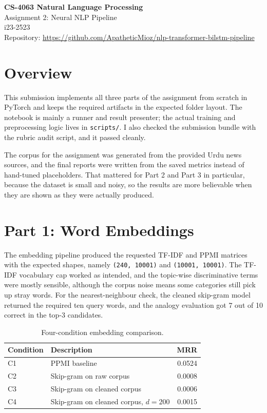 \documentclass[12pt]{article}
\begin{document}
\begin{center}
{\Large \textbf{CS-4063 Natural Language Processing}}\\[0.25em]
{\large Assignment 2: Neural NLP Pipeline}\\[0.4em]
{i23-2523}\\[0.25em]
Repository: \url{https://github.com/ApatheticMioz/nlp-transformer-bilstm-pipeline}
\end{center}

\section{Overview}
This submission implements all three parts of the assignment from scratch in PyTorch and keeps the required artifacts in the expected folder layout. The notebook is mainly a runner and result presenter; the actual training and preprocessing logic lives in \texttt{scripts/}. I also checked the submission bundle with the rubric audit script, and it passed cleanly.

The corpus for the assignment was generated from the provided Urdu news sources, and the final reports were written from the saved metrics instead of hand-tuned placeholders. That mattered for Part 2 and Part 3 in particular, because the dataset is small and noisy, so the results are more believable when they are shown as they were actually produced.

\section{Part 1: Word Embeddings}
The embedding pipeline produced the requested TF-IDF and PPMI matrices with the expected shapes, namely \texttt{(240, 10001)} and \texttt{(10001, 10001)}. The TF-IDF vocabulary cap worked as intended, and the topic-wise discriminative terms were mostly sensible, although the corpus noise means some categories still pick up stray words. For the nearest-neighbour check, the cleaned skip-gram model returned the required ten query words, and the analogy evaluation got 7 out of 10 correct in the top-3 candidates.

\begin{table}[h]
\centering
\small
\begin{tabularx}{\linewidth}{@{}lXr@{}}
\toprule
Condition & Description & MRR \\
\midrule
C1 & PPMI baseline & 0.0524 \\
C2 & Skip-gram on raw corpus & 0.0008 \\
C3 & Skip-gram on cleaned corpus & 0.0006 \\
C4 & Skip-gram on cleaned corpus, $d=200$ & 0.0015 \\
\bottomrule
\end{tabularx}
\caption{Four-condition embedding comparison.}
\end{table}
\end{document}
